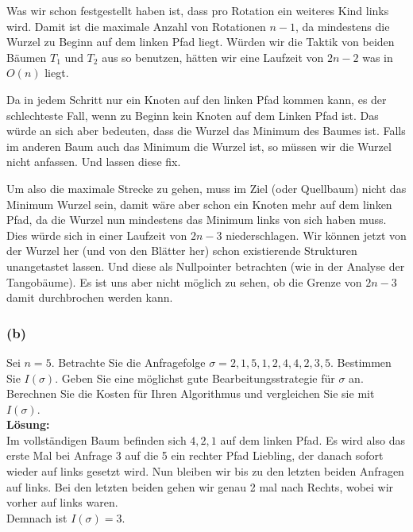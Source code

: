\documentclass[11pt,a4paper,ngerman]{article}
\begin{document}
Was wir schon festgestellt haben ist, dass pro Rotation ein weiteres Kind links wird. Damit ist die maximale Anzahl von Rotationen $n-1$, da mindestens die Wurzel zu Beginn auf dem linken Pfad liegt. Würden wir die Taktik von beiden Bäumen $T_1$ und $T_2$ aus so benutzen, hätten wir eine Laufzeit von $2n-2$ was in $O(n)$ liegt.

Da in jedem Schritt nur ein Knoten auf den linken Pfad kommen kann, es der schlechteste Fall, wenn zu Beginn kein Knoten auf dem Linken Pfad ist. Das würde an sich aber
bedeuten, dass die Wurzel das Minimum des Baumes ist. Falls im anderen Baum auch das Minimum die Wurzel ist, so müssen wir die Wurzel nicht anfassen. Und lassen diese fix.

Um also die maximale Strecke zu gehen, muss im Ziel (oder Quellbaum) nicht das Minimum Wurzel sein, damit wäre aber schon ein Knoten mehr auf dem linken Pfad,
da die Wurzel nun mindestens das Minimum links von sich haben muss.\\

Dies würde sich in einer Laufzeit von $2n-3$ niederschlagen. Wir können jetzt von der Wurzel her (und von den Blätter her) schon existierende Strukturen unangetastet lassen. Und diese als Nullpointer betrachten (wie in der Analyse der Tangobäume). Es ist uns aber nicht möglich zu sehen, ob die Grenze von $2n-3$ damit durchbrochen werden kann.

\subsubsection*{(b)}

Sei $n=5$. Betrachte Sie die Anfragefolge $\sigma = 2,1,5,1,2,4,4,2,3,5$. Bestimmen Sie $I(\sigma)$. Geben Sie eine möglichst gute Bearbeitungsstrategie für $\sigma$ an. Berechnen Sie die Kosten für Ihren Algorithmus und vergleichen Sie sie mit $I(\sigma)$.\\

\noindent\textbf{Lösung:}\\

Im vollständigen Baum befinden sich $4,2,1$ auf dem linken Pfad. Es wird also das erste Mal bei Anfrage $3$ auf die 5 ein rechter Pfad Liebling, der danach sofort wieder auf links gesetzt wird. Nun bleiben wir bis zu den letzten beiden Anfragen auf links. Bei den letzten beiden gehen wir genau 2 mal nach Rechts, wobei wir vorher auf links waren.\\

Demnach ist $I(\sigma) = 3$.\\
\end{document}
